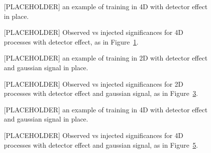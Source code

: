 \documentclass[../../ddppaper2.tex]{subfiles}
\begin{document}
\begin{figure}
    \centering
    \placeholdergraphic
    \caption{[PLACEHOLDER] an example of training in 4D with detector effect in place.}
    \label{fig:4d_train_with_detector_effect}
\end{figure}

\begin{figure}
    \centering
    \placeholdergraphic
    \caption{[PLACEHOLDER] Observed vs injected significances for 4D processes with detector effect, as in Figure~\ref{fig:4d_train_with_detector_effect}.}
    \label{fig:4d_with_detector_effect_significances}
\end{figure}

\begin{figure}
    \centering
    \placeholdergraphic
    \caption{[PLACEHOLDER] an example of training in 2D with detector effect and gaussian signal in place.}
    \label{fig:2d_train_with_detector_effect_and_signal}
\end{figure}

\begin{figure}
    \centering
    \placeholdergraphic
    \caption{[PLACEHOLDER] Observed vs injected significances for 2D processes with detector effect and gaussian signal, as in Figure~\ref{fig:2d_train_with_detector_effect_and_signal}.}
    \label{fig:2d_with_detector_effect_and_signal_significances}
\end{figure}

\begin{figure}
    \centering
    \placeholdergraphic
    \caption{[PLACEHOLDER] an example of training in 4D with detector effect and gaussian signal in place.}
    \label{fig:4d_train_with_detector_effect_and_signal}
\end{figure}

\begin{figure}
    \centering
    \placeholdergraphic
    \caption{[PLACEHOLDER] Observed vs injected significances for 4D processes with detector effect and gaussian signal, as in Figure~\ref{fig:4d_train_with_detector_effect_and_signal}.}
    \label{fig:4d_with_detector_effect_and_signal_significances}
\end{figure}
\end{document}

